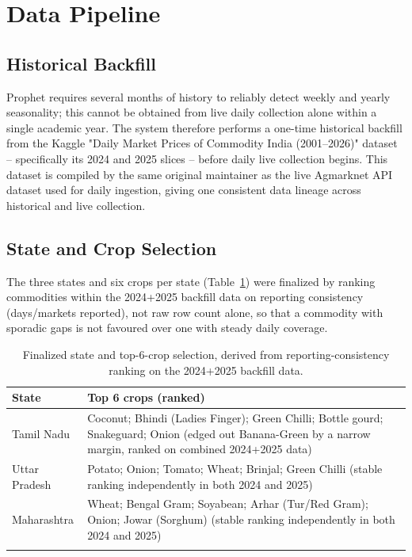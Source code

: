 \section{Data Pipeline}
\subsection{Historical Backfill}
Prophet requires several months of history to reliably detect weekly and
yearly seasonality; this cannot be obtained from live daily collection
alone within a single academic year. The system therefore performs a
one-time historical backfill from the Kaggle "Daily Market Prices of
Commodity India (2001--2026)" dataset -- specifically its 2024 and 2025
slices -- before daily live collection begins. This dataset is compiled
by the same original maintainer as the live Agmarknet API dataset used
for daily ingestion, giving one consistent data lineage across historical
and live collection.

\subsection{State and Crop Selection}
The three states and six crops per state (Table~\ref{tab:cropselection})
were finalized by ranking commodities within the 2024+2025 backfill data
on reporting consistency (days/markets reported), not raw row count
alone, so that a commodity with sporadic gaps is not favoured over one
with steady daily coverage.

\begin{longtable}{@{}p{2.8cm}p{10.5cm}@{}}
\toprule
\textbf{State} & \textbf{Top 6 crops (ranked)} \\
\midrule
\endhead
Tamil Nadu & Coconut; Bhindi (Ladies Finger); Green Chilli; Bottle gourd;
Snakeguard; Onion (edged out Banana-Green by a narrow margin, ranked on
combined 2024+2025 data) \\
Uttar Pradesh & Potato; Onion; Tomato; Wheat; Brinjal; Green Chilli
(stable ranking independently in both 2024 and 2025) \\
Maharashtra & Wheat; Bengal Gram; Soyabean; Arhar (Tur/Red Gram); Onion;
Jowar (Sorghum) (stable ranking independently in both 2024 and 2025) \\
\bottomrule
\caption{Finalized state and top-6-crop selection, derived from
reporting-consistency ranking on the 2024+2025 backfill data.}
\label{tab:cropselection}
\end{longtable}

